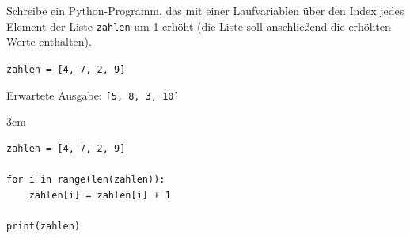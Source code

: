 \question[2]
Schreibe ein Python-Programm, das mit einer Laufvariablen über den Index 
jedes Element der Liste \texttt{zahlen} um 1 erhöht (die Liste soll anschließend die
erhöhten Werte enthalten).

\texttt{zahlen = [4, 7, 2, 9]}

Erwartete Ausgabe: \texttt{[5, 8, 3, 10]}

\begin{solutionbox}{3cm}
\begin{lstlisting}
zahlen = [4, 7, 2, 9]

for i in range(len(zahlen)):
    zahlen[i] = zahlen[i] + 1

print(zahlen)
\end{lstlisting}
\end{solutionbox}